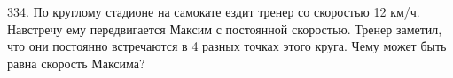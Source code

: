334. По круглому стадионе на самокате ездит тренер со скоростью 12 км/ч. Навстречу ему передвигается Максим с постоянной скоростью. Тренер заметил, что они постоянно встречаются в 4 разных точках этого круга. Чему может быть равна скорость Максима?\\
